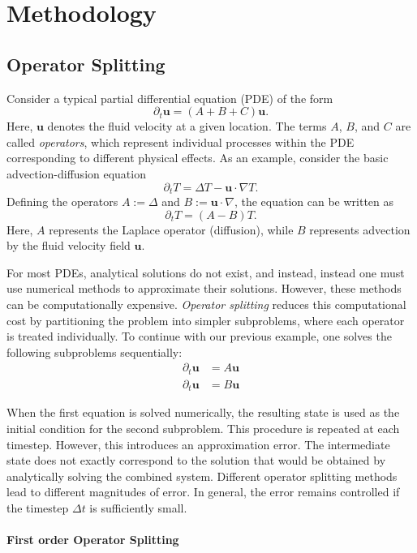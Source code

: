 \chapter{Methodology}


\section{Operator Splitting}

Consider a typical partial differential equation (PDE) of the form
$$ \partial_t \bm{u} = (A + B + C)\bm{u}. $$
Here, $\bm{u}$ denotes the fluid velocity at a given location. The terms
$A$, $B$, and $C$ are called \textit{operators}, which represent 
individual processes within the PDE corresponding to different physical 
effects. As an example, consider the basic advection-diffusion equation
$$\partial_t T = \Delta T - \bm{u} \cdot \nabla T.$$
Defining the operators $A := \Delta$ and $B := \bm{u} \cdot \nabla$, the 
equation can be written as
$$\partial_t T  = (A - B) T.$$
Here, $A$ represents the Laplace operator (diffusion), while $B$ 
represents advection by the fluid velocity field $\bm{u}$.

For most PDEs, analytical solutions do not exist, and instead, instead one must use numerical methods to approximate their solutions. However, these 
methods can be computationally expensive. \textit{Operator splitting} 
reduces this computational cost by partitioning the problem into simpler
subproblems, where each operator is treated individually. To continue 
with our previous example, one solves the following subproblems 
sequentially: 
\begin{align}
\partial_t \bm{u} &= A \bm{u} \\
\partial_t \bm{u} &= B \bm{u}
\end{align}

When the first equation is solved numerically, the resulting state is used as the initial condition for the second subproblem. This procedure is
repeated at each timestep. However, this introduces an approximation 
error. The intermediate state does not exactly correspond to the solution
that would be obtained by analytically solving the combined system.
Different operator splitting methods lead to different magnitudes of
error. In general, the error remains controlled if the timestep $\Delta t$
is sufficiently small.

\subsubsection{First order Operator Splitting}

